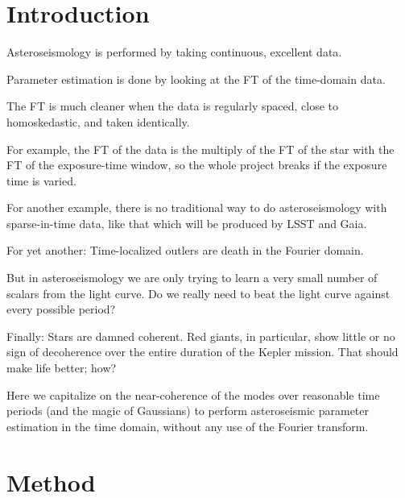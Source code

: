 \documentclass[modern]{aastex61}
\begin{document}

\section{Introduction}\label{sec:intro}

Asteroseismology is performed by taking continuous, excellent data.

Parameter estimation is done by looking at the FT of the time-domain data.

The FT is much cleaner when the data is regularly spaced, close to
homoskedastic, and taken identically.

For example, the FT of the data is the multiply of the FT of the star
with the FT of the exposure-time window, so the whole project breaks
if the exposure time is varied.

For another example, there is no traditional way to do
asteroseismology with sparse-in-time data, like that which will be
produced by LSST and Gaia.

For yet another: Time-localized outlers are death in the Fourier domain.

But in asteroseismology we are only trying to learn a very small number
of scalars from the light curve. Do we really need to beat the light curve
against every possible period?

Finally: Stars are damned coherent. Red giants, in particular, show little
or no sign of decoherence over the entire duration of the Kepler mission.
That should make life better; how?

Here we capitalize on the near-coherence of the modes over reasonable
time periods (and the magic of Gaussians) to perform asteroseismic
parameter estimation in the time domain, without any use of the
Fourier transform.

\section{Method}\label{sec:method}
\end{document}
